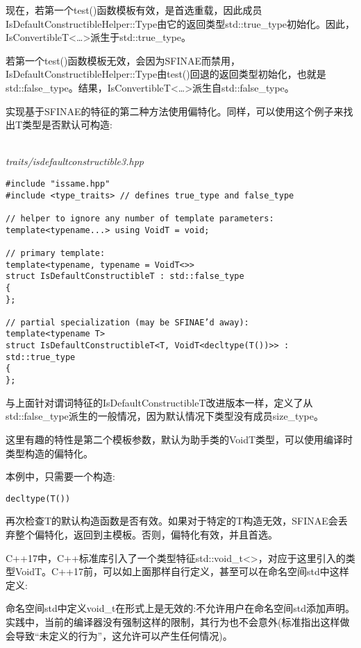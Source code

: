 现在，若第一个test()函数模板有效，是首选重载，因此成员IsDefaultConstructibleHelper::Type由它的返回类型std::true\_type初始化。因此，IsConvertibleT<…>派生于std::true\_type。

若第一个test()函数模板无效，会因为SFINAE而禁用，IsDefaultConstructibleHelper::Type由test()回退的返回类型初始化，也就是std::false\_type。结果，IsConvertibleT<…>派生自std::false\_type。


实现基于SFINAE的特征的第二种方法使用偏特化。同样，可以使用这个例子来找出T类型是否默认可构造:

\hspace*{\fill} \\ %
\noindent
\textit{traits/isdefaultconstructible3.hpp}
\begin{lstlisting}[style=styleCXX]
#include "issame.hpp"
#include <type_traits> // defines true_type and false_type

// helper to ignore any number of template parameters:
template<typename...> using VoidT = void;

// primary template:
template<typename, typename = VoidT<>>
struct IsDefaultConstructibleT : std::false_type
{
};

// partial specialization (may be SFINAE’d away):
template<typename T>
struct IsDefaultConstructibleT<T, VoidT<decltype(T())>> : std::true_type
{
};
\end{lstlisting}

与上面针对谓词特征的IsDefaultConstructibleT改进版本一样，定义了从std::false\_type派生的一般情况，因为默认情况下类型没有成员size\_type。

这里有趣的特性是第二个模板参数，默认为助手类的VoidT类型，可以使用编译时类型构造的偏特化。

本例中，只需要一个构造:

\begin{lstlisting}[style=styleCXX]
decltype(T())
\end{lstlisting}

再次检查T的默认构造函数是否有效。如果对于特定的T构造无效，SFINAE会丢弃整个偏特化，返回到主模板。否则，偏特化有效，并且首选。

C++17中，C++标准库引入了一个类型特征std::void\_t<>，对应于这里引入的类型VoidT。C++17前，可以如上面那样自行定义，甚至可以在命名空间std中这样定义:

\begin{tcolorbox}[colback=webgreen!5!white,colframe=webgreen!75!black]
\hspace*{0.75cm}命名空间std中定义void\_t在形式上是无效的:不允许用户在命名空间std添加声明。实践中，当前的编译器没有强制这样的限制，其行为也不会意外(标准指出这样做会导致“未定义的行为”，这允许可以产生任何情况)。
\end{tcolorbox}

